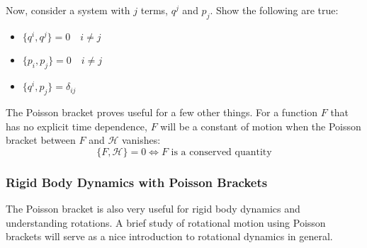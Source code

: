 \begin{exercise}
Now, consider a system with $j$ terms, $q^j$ and $p_j$. Show the following are true:
\begin{itemize}
    \item $\{q^i,q^j\}=0\quad i\ne j$
    \item $\{p_i,p_j\}=0\quad i\ne j$
    \item $\{q^i,p_j\}=\delta_{ij}$
\end{itemize}
\end{exercise}

The Poisson bracket proves useful for a few other things. For a function $F$ that has no explicit time dependence, $F$ will be a constant of motion when the Poisson bracket between $F$ and $\mathcal{H}$ vanishes:
$$\{F,\mathcal{H}\}=0\Leftrightarrow F\text{ is a conserved quantity}$$
\subsubsection{Rigid Body Dynamics with Poisson Brackets}
The Poisson bracket is also very useful for rigid body dynamics and understanding rotations. A brief study of rotational motion using Poisson brackets will serve as a nice introduction to rotational dynamics in general.



